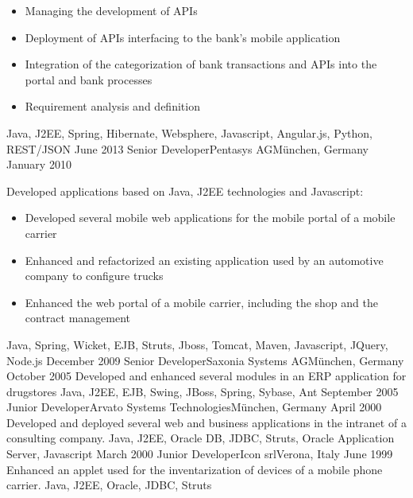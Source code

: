 \begin{experiences}
{\begin{itemize}
                        \item Managing the development of APIs
                        \item Deployment of APIs interfacing to the bank's mobile application 
                        \item Integration of the categorization of bank transactions and APIs into the portal and bank processes
						 \item Requirement analysis and definition                                                
                      \end{itemize}
                    }
                    {Java, J2EE, Spring, Hibernate, Websphere, Javascript, Angular.js, Python, REST/JSON}
  \emptySeparator
  \experience
    {June 2013}    {Senior Developer}{Pentasys AG}{München, Germany}
    {January 2010} {Developed applications based on Java, J2EE technologies and Javascript:   
                      \begin{itemize}
                        \item Developed several mobile web applications for the mobile portal of a mobile carrier
                        \item Enhanced and refactorized an existing application used by an automotive company to configure trucks                 
                        \item Enhanced the web portal of a mobile carrier, including the shop and the contract management
                      \end{itemize}
                    }
                    {Java, Spring, Wicket, EJB, Struts, Jboss, Tomcat, Maven, Javascript, JQuery, Node.js}
  \emptySeparator
  \consultantexperience
  {December 2009}   {Senior Developer}{Saxonia Systems AG}{München, Germany}
  {October 2005}    {
  					     Developed and enhanced several modules in an ERP application for drugstores
  					 }
                    {Java, J2EE, EJB, Swing, JBoss, Spring, Sybase, Ant}
  \emptySeparator
  \consultantexperience
  {September 2005}   {Junior Developer}{Arvato Systems Technologies}{München, Germany}
  {April 2000}       {
                     	  Developed and deployed several web and business applications in the intranet of a consulting company.
                     }
                     {Java, J2EE, Oracle DB, JDBC, Struts, Oracle Application Server, Javascript}
  \emptySeparator
  \consultantexperience
  {March 2000}  	{Junior Developer}{Icon srl}{Verona, Italy}
  {June 1999}   	{ 
  				 		Enhanced an applet used for the inventarization of devices of a mobile phone carrier.
  				 	}
                	{Java, J2EE, Oracle, JDBC, Struts} 
\end{experiences}

